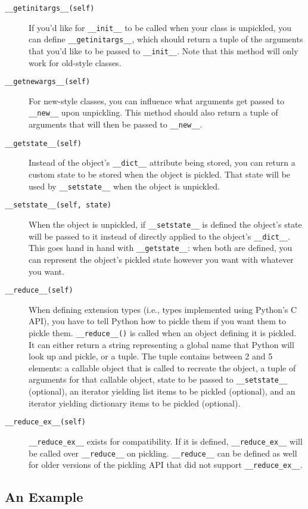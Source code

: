 \documentclass[a4paper,11pt]{article}
\newcommand{\code}[1]{\texttt{#1}}
\begin{document}
\begin{description}

\item[\code{__getinitargs__(self)}]
If you'd like for \code{__init__} to be called when your class is unpickled, you can define \code{__getinitargs__}, which should return a tuple of the arguments that you'd like to be passed to  \code{__init__}. Note that this method will only work for old-style classes.
\item[\code{__getnewargs__(self)}]
For new-style classes, you can influence what arguments get passed to \code{__new__} upon unpickling. This method should also return a tuple of arguments that will then be passed to \code{__new__}.
\item[\code{__getstate__(self)}]
Instead of the object's \code{__dict__} attribute being stored, you can return a custom state to be stored when the object is pickled. That state will be used by \code{__setstate__} when the object is unpickled.
\item[\code{__setstate__(self, state)}]
When the object is unpickled, if \code{__setstate__} is defined the object's state will be passed to it instead of directly applied to the object's \code{__dict__}. This goes hand in hand with \code{__getstate__}: when both are defined, you can represent the object's pickled state however you want with whatever you want.
\item[\code{__reduce__(self)}]
When defining extension types (i.e., types implemented using Python's C API), you have to tell Python how to pickle them if you want them to pickle them. \code{__reduce__()} is called when an object defining it is pickled. It can either return a string representing a global name that Python will look up and pickle, or a tuple. The tuple contains between 2 and 5 elements: a callable object that is called to recreate the object, a tuple of arguments for that callable object, state to be passed to \code{__setstate__} (optional), an iterator yielding list items to be pickled (optional),  and an iterator yielding dictionary items to be pickled (optional).
\item[\code{__reduce_ex__(self)}]
\code{__reduce_ex__} exists for compatibility. If it is defined, \code{__reduce_ex__} will be called over \code{__reduce__} on pickling. \code{__reduce__} can be defined as well for older versions of the pickling API that did not support \code{__reduce_ex__}.
\end{description}

\subsection{An Example}
\end{document}
